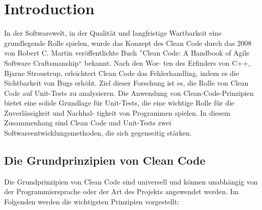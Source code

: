 \documentclass[conference]{IEEEtran}
\begin{document}
\section{Introduction}
In der Softwarewelt, in der Qualität und langfristige Wartbarkeit eine grundlegende Rolle
spielen, wurde das Konzept des Clean Code durch das 2008 von Robert C. Martin veröffentlichte
Buch ”Clean Code: A Handbook of Agile Software Craftsmanship“ bekannt. Nach den Wor-
ten des Erfinders von C++, Bjarne Stroustrup, erleichtert Clean Code das Fehlerhandling,
indem es die Sichtbarkeit von Bugs erhöht. \cite{martin2009clean} Ziel dieser Forschung ist es, die Rolle von 
Clean Code auf Unit-Tests zu analysieren. Die Anwendung von Clean-Code-Prinzipien bietet eine
solide Grundlage für Unit-Tests, die eine wichtige Rolle für die Zuverlãssigkeit und Nachhal-
tigkeit von Programmen spielen. In diesem Zusammenhang sind Clean Code und Unit-Tests
zwei Softwareentwicklungsmethoden, die sich gegenseitig stärken.

\subsection{Die Grundprinzipien von Clean Code}
Die Grundprinzipien von Clean Code sind universell und können unabhängig von der Programmiersprache oder der Art des Projekts angewendet werden. Im Folgenden werden die wichtigsten Prinzipien vorgestellt: \\
\end{document}
